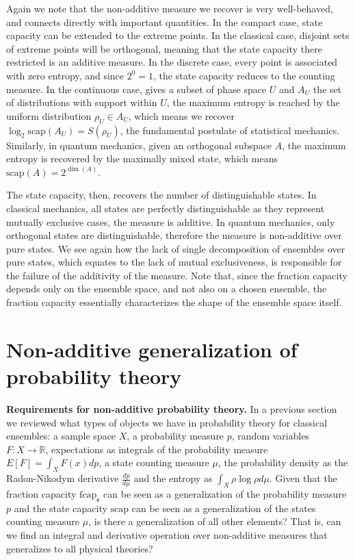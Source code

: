 \documentclass[10pt,twocolumn, nofootinbib]{revtex4-2}
\newcommand\capacity{\mathrm{scap}}
\newcommand\frcap{\mathrm{fcap}}
\newcommand{\ens}[1][e] {\mathsf{#1}} %
\begin{document}
Again we note that the non-additive measure we recover is very well-behaved, and connects directly with important quantities. In the compact case, state capacity can be extended to the extreme points. In the classical case, disjoint sets of extreme points will be orthogonal, meaning that the state capacity there restricted is an additive measure. In the discrete case, every point is associated with zero entropy, and since $2^0=1$, the state capacity reduces to the counting measure. In the continuous case, gives a subset of phase space $U$ and $A_U$ the set of distributions with support within $U$, the maximum entropy is reached by the uniform distribution $\rho_U \in A_U$, which means we recover $\log_2 \capacity(A_U) = S(\rho_U)$, the fundamental postulate of statistical mechanics. Similarly, in quantum mechanics, given an orthogonal subspace $A$, the maximum entropy is recovered by the maximally mixed state, which means $\capacity(A) = 2^{\dim(A)}$.

The state capacity, then, recovers the number of distinguishable states. In classical mechanics, all states are perfectly distinguishable as they represent mutually exclusive cases, the measure is additive. In quantum mechanics, only orthogonal states are distinguishable, therefore the measure is non-additive over pure states. We see again how the lack of single decomposition of ensembles over pure states, which equates to the lack of mutual exclusiveness, is responsible for the failure of the additivity of the measure. Note that, since the fraction capacity depends only on the ensemble space, and not also on a chosen ensemble, the fraction capacity essentially characterizes the shape of the ensemble space itself.

\section{Non-additive generalization of probability theory}

\textbf{Requirements for non-additive probability theory.} In a previous section we reviewed what types of objects we have in probability theory for classical ensembles: a sample space $X$, a probability measure $p$, random variables $F : X \to \mathbb{R}$, expectations as integrals of the probability measure $E[F] = \int_X F(x) dp$, a state counting measure $\mu$, the probability density as the Radon-Nikodym derivative $\frac{dp}{d\mu}$ and the entropy as $\int_X \rho \log \rho d\mu$.  Given that the fraction capacity $\frcap_{\ens}$ can be seen as a generalization of the probability measure $p$ and the state capacity $\capacity$ can be seen as a generalization of the states counting measure $\mu$, is there a generalization of all other elements? That is, can we find an integral and derivative operation over non-additive measures that generalizes to all physical theories?
\end{document}
